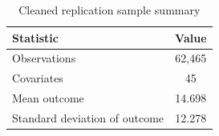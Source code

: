 \begin{table}[h]
\centering
\caption{Cleaned replication sample summary}
\begin{tabular}{lc}
\toprule
Statistic & Value \\
\midrule
Observations & 62,465 \\
Covariates & 45 \\
Mean outcome & 14.698 \\
Standard deviation of outcome & 12.278 \\
\bottomrule
\end{tabular}
\label{tab:summary}
\end{table}

